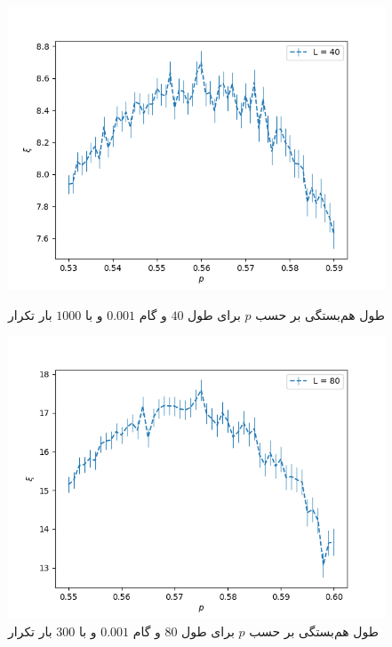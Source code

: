 \documentclass[11pt, a4paper]{article}
\begin{document}
\begin{figure}[h]
\begin{minipage}[b]{0.48\textwidth}
    \includegraphics[width=\textwidth]{q5_0.53_0.001_0.59_1000_(40,)}
    \caption{طول هم‌بستگی بر حسب $p$ برای طول $40$ و گام $0.001$ و با $1000$ بار تکرار}
    \label{fig:q5_40}
  \end{minipage}
  \hfill
  \begin{minipage}[b]{0.48\textwidth}
    \includegraphics[width=\textwidth]{q5_0.55_0.001_0.6_300_(80,)}
    \caption{طول هم‌بستگی بر حسب $p$ برای طول $80$ و گام $0.001$ و با $300$ بار تکرار}
    \label{fig:q5_80}
  \end{minipage}
  \begin{minipage}[b]{0.48\textwidth}

\end{minipage}
\end{figure}
\end{document}
